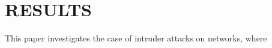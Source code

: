 \documentclass[%
 reprint,
 amsmath,amssymb,
 aip,
]{revtex4-2}
\theoremstyle{italichead}
\theoremstyle{definition}
\begin{document}
{%



\section{RESULTS}

This paper investigates the case of intruder attacks on networks,
where %
}
\end{document}
